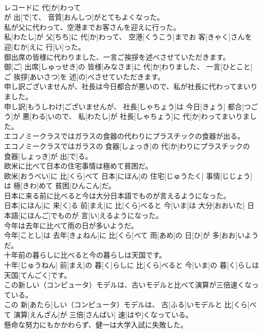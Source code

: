 \documentclass[8pt]{extreport}
\begin{document}
\begin{CJK}{UTF8}{min}
\\	レコードに 代[か]わって 
\\	が 出[で]て、 音質[おんしつ]がとてもよくなった。
\\	私が父に代わって、空港までお客さんを迎えに行った。	
\\	私[わたし]が 父[ちち]に 代[か]わって、 空港[くうこう]までお 客[きゃく]さんを 迎[むか]えに 行[い]った。
\\	御出席の皆様に代わりました、一言ご挨拶を述べさせていただきます。	
\\	御[ご] 出席[しゅっせき]の 皆様[みなさま]に 代[か]わりました、 一言[ひとこと]ご 挨拶[あいさつ]を 述[の]べさせていただきます。
\\	申し訳ございませんが、社長は今日都合が悪いので、私が社長に代わってまいりました。	
\\	申し訳[もうしわけ]ございませんが、 社長[しゃちょう]は 今日[きょう] 都合[つごう]が 悪[わる]いので、 私[わたし]が 社長[しゃちょう]に 代[か]わってまいりました。
\\	エコノミークラスではガラスの食器の代わりにプラスチックの食器が出る。	
\\	エコノミークラスではガラスの 食器[しょっき]の 代[か]わりにプラスチックの 食器[しょっき]が 出[で]る。
\\	欧米に比べて日本の住宅事情は極めて貧困だ。	
\\	欧米[おうべい]に 比[くら]べて 日本[にほん]の 住宅[じゅうたく] 事情[じじょう]は 極[きわ]めて 貧困[ひんこん]だ。
\\	日本に来る前に比べると今は大分日本語でものが言えるようになった。	
\\	日本[にほん]に 来[く]る 前[まえ]に 比[くら]べると 今[いま]は 大分[おおいた] 日本語[にほんご]でものが 言[い]えるようになった。
\\	今年は去年に比べて雨の日が多いようだ。	
\\	今年[ことし]は 去年[きょねん]に 比[くら]べて 雨[あめ]の 日[ひ]が 多[おお]いようだ。
\\	十年前の暮らしに比べると今の暮らしは天国です。	
\\	十年[じゅうねん] 前[まえ]の 暮[く]らしに 比[くら]べると 今[いま]の 暮[く]らしは 天国[てんごく]です。
\\	この新しい（コンピュータ）モデルは、古いモデルと比べて演算が三倍速くなっている。	
\\	この 新[あたら]しい（コンピュータ）モデルは、 古[ふる]いモデルと 比[くら]べて 演算[えんざん]が 三倍[さんばい] 速[はや]くなっている。
\\	懸命な努力にもかかわらず、健一は大学入試に失敗した。	

\end{CJK}
\end{document}
